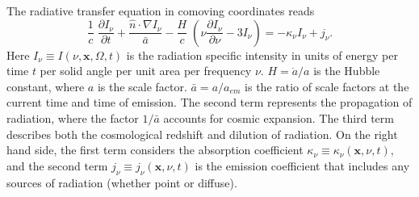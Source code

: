 The radiative transfer equation in comoving coordinates 
\citep[e.g.,][]{Gnedin97} reads
%
\begin{equation}
  \label{eq:rteqn}
  \frac{1}{c} \; \frac{\partial I_\nu}{\partial t} + 
  \frac{\hat{n} \cdot \nabla I_\nu}{\bar{a}} -
  \frac{H}{c} \; \left( \nu \frac{\partial I_\nu}{\partial \nu} -
  3 I_\nu \right) = -\kappa_\nu I_\nu + j_\nu .
\end{equation}
%
Here $I_\nu \equiv I(\nu, \mathbf{x}, \Omega, t)$ is the radiation
specific intensity in units of energy per time $t$ per solid angle per
unit area per frequency $\nu$.  $H = \dot{a}/a$ is the Hubble
constant, where $a$ is the scale factor.  $\bar{a} = a/a_{em}$ is the
ratio of scale factors at the current time and time of emission.  The
second term represents the propagation of radiation, where the factor
$1/\bar{a}$ accounts for cosmic expansion.  The third term describes
both the cosmological redshift and dilution of radiation.  On the
right hand side, the first term considers the absorption coefficient
$\kappa_\nu \equiv \kappa_\nu(\mathbf{x},\nu,t)$, and the second term
$j_\nu \equiv j_\nu(\mathbf{x},\nu,t)$ is the emission coefficient
that includes any sources of radiation (whether point or diffuse).


